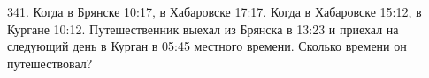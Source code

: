 341. Когда в Брянске 10:17, в Хабаровске 17:17. Когда в Хабаровске 15:12, в Кургане 10:12. Путешественник выехал из Брянска в 13:23 и приехал на следующий день в Курган в 05:45 местного времени. Сколько времени он путешествовал?
\newpage
